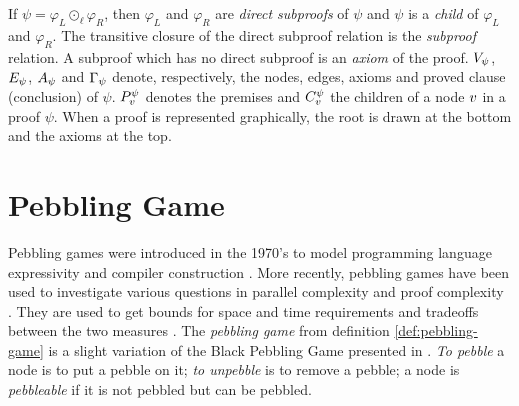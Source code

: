 \documentclass{llncs}
\begin{document}
\noindent
If $\psi = \varphi_L \odot_{\ell} \varphi_R$, then $\varphi_L$ and $\varphi_R$ are \emph{direct
subproofs} of $\psi$ and $\psi$ is a \emph{child} of $\varphi_L$ and $\varphi_R$. The
transitive closure of the direct subproof relation is the \emph{subproof} relation. A subproof which
has no direct subproof is an \emph{axiom} of the proof. 
%
$V_{\psi}$, $E_{\psi}$, $A_{\psi}$ and $\Gamma_{\psi}$
denote, respectively, the nodes, edges, axioms and proved clause (conclusion) of $\psi$. $P_{v}^{\psi}$ denotes the premises and $C_{v}^{\psi}$ the children of a node $v$ in a proof $\psi$. When a proof is represented graphically, the root is drawn at the bottom and the axioms at the top.


\section{Pebbling Game}
\label{sec:pebbling-game}

Pebbling games were introduced in the 1970's to model programming language expressivity \cite{paterson1970comparative,Walker1973404} and compiler construction \cite{sethi1975complete}. More recently, pebbling games have been used to investigate various questions in parallel complexity \cite{chan2013pebble} and proof complexity \cite{ben2008short,Esteban200184,nordstrom2009narrow}. They are used to get bounds for space and time requirements and tradeoffs between the two measures \cite{van1979move}. The \emph{pebbling game} from definition \ref{def:pebbling-game} is a slight variation of the Black Pebbling Game presented in \cite{hertel2007black,pippenger1982advances}.  \textit{To pebble} a node is to put a pebble on it; \textit{to unpebble} is to remove a pebble; a node is \textit{pebbleable} if it is not pebbled but can be pebbled.
\end{document}
